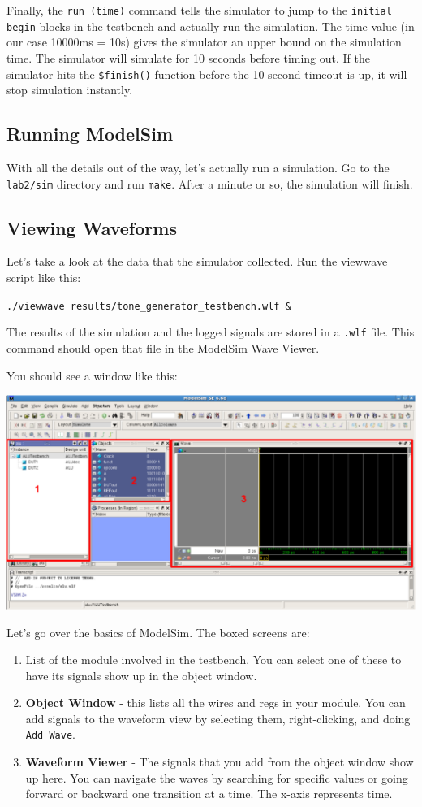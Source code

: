 \documentclass[11pt]{article}
\begin{document}
Finally, the \verb|run (time)| command tells the simulator to jump to the \verb|initial begin| blocks in the testbench and actually run the simulation. The time value (in our case 10000ms = 10s) gives the simulator an upper bound on the simulation time. The simulator will simulate for 10 seconds before timing out. If the simulator hits the \verb|$finish()| function before the 10 second timeout is up, it will stop simulation instantly.

\subsection{Running ModelSim}

With all the details out of the way, let's actually run a simulation. Go to the \verb|lab2/sim| directory and run \verb|make|. After a minute or so, the simulation will finish.

\subsection{Viewing Waveforms}

Let's take a look at the data that the simulator collected. Run the viewwave script like this:

\verb|./viewwave results/tone_generator_testbench.wlf &|

The results of the simulation and the logged signals are stored in a \verb|.wlf| file. This command should open that file in the ModelSim Wave Viewer.

You should see a window like this:

\includegraphics[width=\textwidth]{images/modelsim.png}

Let's go over the basics of ModelSim. The boxed screens are:

\begin{enumerate}
	\item List of the module involved in the testbench. You can select one of these to have its signals show up in the object window.
	\item \textbf{Object Window} - this lists all the wires and regs in your module. You can add signals to the waveform view by selecting them, right-clicking, and doing \verb|Add Wave|.
	\item \textbf{Waveform Viewer} - The signals that you add from the object window show up here. You can navigate the waves by searching for specific values or going forward or backward one transition at a time. The x-axis represents time.
\end{enumerate}
\end{document}
